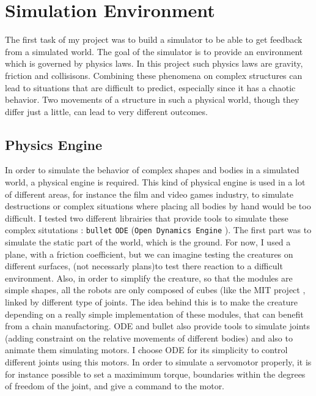 
\chapter{Simulation Environment} %

\label{Chapter 2} %


The first task of my project was to build a simulator to be able to get feedback from a simulated world. The goal of the simulator is to provide an environment which is governed by physics laws. In this project such physics laws are gravity, friction and collisisons. Combining these phenomena on complex structures can lead to situations that are difficult to predict, especially since it has a chaotic behavior. Two movements of a structure in such a physical world, though they differ just a little, can lead to very different outcomes.  

\section{Physics Engine}

In order to simulate the behavior of complex shapes and bodies in a simulated world, a physical engine is required. This kind of physical engine is used in a lot of different areas, for instance the film and video games industry, to simulate destructions or complex situations where placing all bodies by hand would be too difficult. I tested two different librairies that provide tools to simulate these complex situtations : \verb?bullet? \verb?ODE? (\verb?Open Dynamics Engine? \cite{ode}). The first part was to simulate the static part of the world, which is the ground. For now, I used a plane, with a friction coefficient, but we can imagine testing the creatures on different surfaces, (not necessarly plans)to test there reaction to a difficult environment. Also, in order to simplify the creature, so that the modules are simple shapes, all the robots are only composed of cubes (like the MIT project \cite{mitcubes}, linked by different type of joints. The idea behind this is to make the creature depending on a really simple implementation of these modules, that can benefit from a chain manufactoring. ODE and bullet also provide tools to simulate joints (adding constraint on the relative movements of different bodies) and also to animate them simulating motors. I choose ODE for its simplicity to control different joints using this motors. In order to simulate a servomotor properly, it is for instance possible to set a maximimum torque, boundaries within the degrees of freedom of the joint, and give a command to the motor.
 
